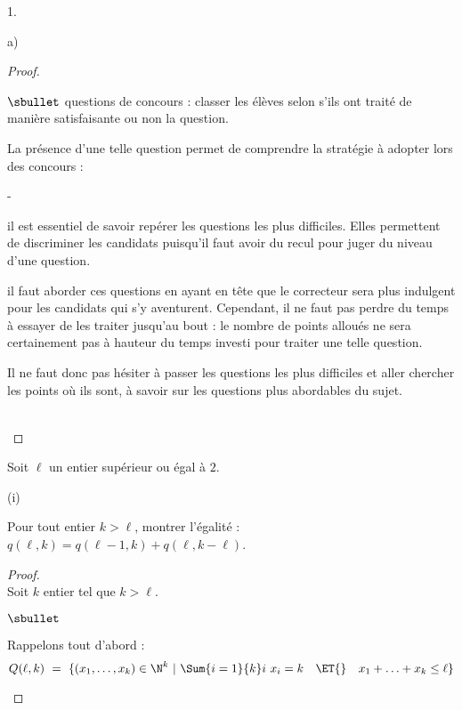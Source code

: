 \begin{noliste}{1.}
\begin{noliste}{a)}
\begin{proof}
\begin{remarkL}{.98}
\begin{noliste}{$\sbullet$}
          questions de concours : classer les élèves selon
          s'ils ont traité de manière satisfaisante ou non la question.
        \end{noliste}
        La présence d'une telle question permet de comprendre la
        stratégie à adopter lors des concours :
        \begin{noliste}{-}
        \item il est essentiel de savoir repérer les questions les
          plus difficiles. Elles permettent de discriminer les candidats
          puisqu'il faut avoir du recul pour juger du niveau d'une
          question.
        \item il faut aborder ces questions en
          ayant en tête que le correcteur sera plus indulgent pour les
          candidats qui s'y aventurent. Cependant, il ne faut pas
          perdre du temps à essayer de les traiter jusqu'au bout : le
          nombre de points alloués ne sera certainement pas à hauteur
          du temps investi pour traiter une telle question. 
        \end{noliste}
        Il ne faut donc pas hésiter à passer les questions les plus
        difficiles et aller chercher les points où ils sont, à savoir
        sur les questions plus abordables du sujet.
      \end{remarkL}~\\[-1.4cm]
    \end{proof}


    \newpage
    
    
  \item Soit $\ell$ un entier supérieur ou égal à $2$.
    \begin{nonoliste}{(i)}
    \item Pour tout entier $k > \ell$, montrer l'égalité : \
      $q(\ell,k) = q(\ell-1,k) + q(\ell, k-\ell)$.
      
      \begin{proof}~\\%
        Soit $k$ entier tel que $k > \ell$.
        \begin{noliste}{$\sbullet$}
        \item Rappelons tout d'abord :
          \[
          Q(\ell, k) \ = \ \{ (x_1, \ldots, x_{k}) \in \N^{k} \ | \
          \Sum{i=1}{k} i \ x_i = k \quad \ET{} \quad x_1 + \ldots + x_{k} \leq
          \ell \}
          \]


\end{noliste}
\end{proof}
\end{nonoliste}
\end{noliste}
\end{noliste}
